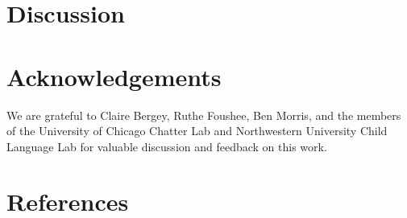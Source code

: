 \documentclass[10pt, letterpaper]{article}
\begin{document}
\hypertarget{discussion}{%
\section{Discussion}\label{discussion}}

\hypertarget{acknowledgements}{%
\section{Acknowledgements}\label{acknowledgements}}

We are grateful to Claire Bergey, Ruthe Foushee, Ben Morris, and the
members of the University of Chicago Chatter Lab and Northwestern
University Child Language Lab for valuable discussion and feedback on
this work.

\hypertarget{references}{%
\section{References}\label{references}}

\setlength{\parindent}{-0.1in} 
\setlength{\leftskip}{0.125in}

\noindent
\end{document}
